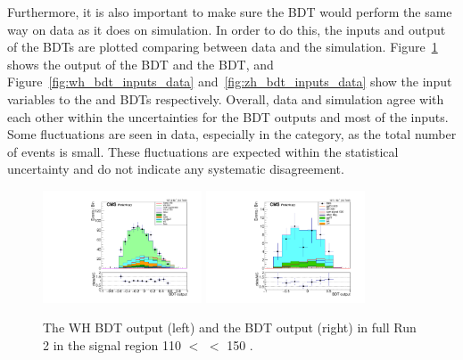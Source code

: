 Furthermore, it is also important to make sure the BDT would perform the same way on data as it does on simulation.
In order to do this, the inputs and output of the BDTs are plotted comparing between data and the simulation.
Figure~\ref{fig:vh_bdt_output_data} shows the output of the \WH BDT and the \ZH BDT, 
and Figure~\ref{fig:wh_bdt_inputs_data} and~\ref{fig:zh_bdt_inputs_data} show the input variables to the \WH and \ZH BDTs respectively.
Overall, data and simulation agree with each other within the uncertainties for the BDT outputs and most of the inputs.
Some fluctuations are seen in data, especially in the \ZH category, as the total number of events is small. 
These fluctuations are expected within the statistical uncertainty and do not indicate any systematic disagreement.

\begin{figure}[!htb]
  \centering
  \captionsetup{justification=justified}
  \includegraphics[width=0.42\textwidth]{pics/VH_sec/valid_BDT_WH/BDT_final.pdf}
  \includegraphics[width=0.42\textwidth]{pics/VH_sec/valid_BDT_ZH/BDT_final.pdf}
  \caption{The WH BDT output (left) and the \ZH BDT output (right) in full Run 2 in the signal region 110 \GeV $<$ \mmm $<$ 150 \GeV.}
  \label{fig:vh_bdt_output_data}
\end{figure}

